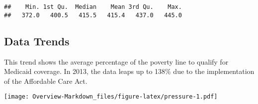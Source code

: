 \documentclass[
]{article}
\begin{document}
\begin{verbatim}
##    Min. 1st Qu.  Median    Mean 3rd Qu.    Max. 
##   372.0   400.5   415.5   415.4   437.0   445.0
\end{verbatim}

\hypertarget{data-trends}{%
\subsection{Data Trends}\label{data-trends}}

This trend shows the average percentage of the poverty line to qualify
for Medicaid coverage. In 2013, the data leaps up to 138\% due to the
implementation of the Affordable Care Act.

\texttt{[image: Overview-Markdown\_files/figure-latex/pressure-1.pdf]}
\end{document}
